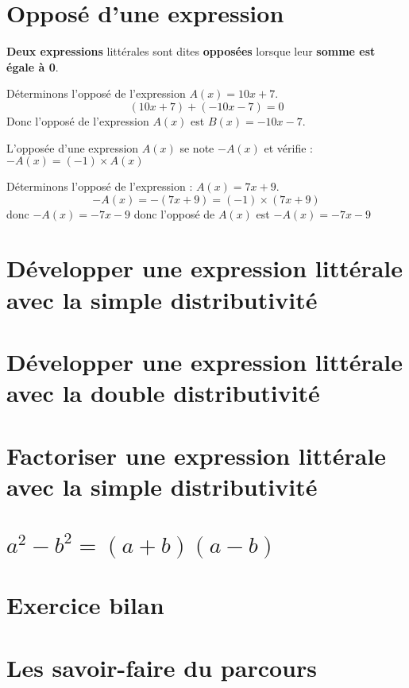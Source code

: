 \documentclass[a4paper,dvipsnames]{article}
\begin{document}
\section{Opposé d'une expression}

\begin{Def}
\textbf{Deux expressions} littérales sont dites \textbf{opposées} lorsque leur \textbf{somme est égale à 0}.
\end{Def}

\begin{Ex}
Déterminons l'opposé de l'expression $A(x)=10x+7$.
\[(10x+7)+(-10x-7)=0\]
Donc l'opposé de l'expression $A(x)$ est $B(x)=-10x-7$.
\end{Ex}

\begin{Pp}
L'opposée d'une expression $A(x)$ se note $-A(x)$ et vérifie : $-A(x)=(-1)\times A(x)$
\end{Pp}

\begin{Ex}
Déterminons l'opposé de l'expression : $A(x)=7x+9$.
\[-A(x)=-(7x+9)=(-1)\times(7x+9)\]
donc $-A(x)=-7x-9$ donc l'opposé de $A(x)$ est $-A(x)=-7x-9$ 
\end{Ex}

\section{Développer une expression littérale avec la simple distributivité}

\section{Développer une expression littérale avec la double distributivité}

\section{Factoriser une expression littérale avec la simple distributivité}

\section{$a^2-b^2=(a+b)(a-b)$}

\section{Exercice bilan}

\section{Les savoir-faire du parcours}
\end{document}
